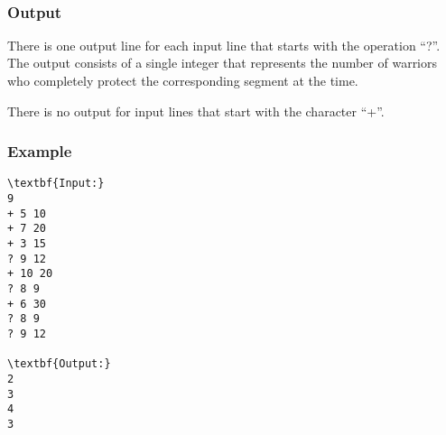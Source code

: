 \\

\subsubsection{   Output  }

    There is one output line for each input line that starts with the operation “?”. The output consists of a single integer that represents the number of warriors who completely protect the corresponding segment at the time.   

     There is no output for input lines that start with the character “+”.    

\subsubsection{   Example  }
\begin{verbatim}
\textbf{Input:}
9
+ 5 10
+ 7 20
+ 3 15
? 9 12
+ 10 20
? 8 9
+ 6 30
? 8 9
? 9 12

\textbf{Output:}
2
3
4
3\end{verbatim}
